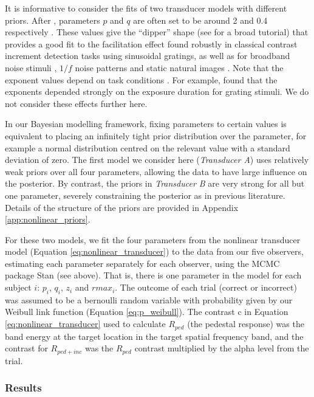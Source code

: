 \documentclass[11pt,a4paper]{article}
\begin{document}
It is informative to consider the fits of two transducer models with different priors.
After \citet{Legge1980}, parameters $p$ and $q$ are often set to be around 2 and 0.4 respectively \citep[e.g.][]{Haun2013a, Alam2014}.
These values give the ``dipper'' shape (see \citet{Solomon2009} for a broad tutorial) that provides a good fit to the facilitation effect found robustly in classical contrast increment detection tasks using sinusoidal gratings, as well as for broadband noise stimuli \citep{Henning2007}, $1/f$ noise patterns \citep{Haun2010} and static natural images \citep{Bex2007}.
Note that the exponent values depend on task conditions \citep{Wichmann1999, Meese2002, Yu2003, Kwon2008, Haun2010}. 
For example, \citet{Wichmann1999} found that the exponents depended strongly on the exposure duration for grating stimuli.
We do not consider these effects further here.

In our Bayesian modelling framework, fixing parameters to certain values is equivalent to placing an infinitely tight prior distribution over the parameter, for example a normal distribution centred on the relevant value with a standard deviation of zero.
The first model we consider here (\textit{Transducer A}) uses relatively weak priors over all four parameters, allowing the data to have large influence on the posterior.
By contrast, the priors in \textit{Transducer B} are very strong for all but one parameter, severely constraining the posterior as in previous literature.
Details of the structure of the priors are provided in Appendix \ref{app:nonlinear_priors}.

For these two models, we fit the four parameters from the nonlinear transducer model (Equation \ref{eq:nonlinear_transducer}) to the data from our five observers, estimating each parameter separately for each observer, using the MCMC package Stan (see above).
That is, there is one parameter in the model for each subject $i$: $p_i$, $q_i$, $z_i$ and $rmax_i$.
The outcome of each trial (correct or incorrect) was assumed to be a bernoulli random variable with probability given by our Weibull link function (Equation \ref{eq:p_weibull}).
The contrast $\mathrm{c}$ in Equation \ref{eq:nonlinear_transducer} used to calculate $R_{ped}$ (the pedestal response) was the band energy at the target location in the target spatial frequency band, and the contrast for $R_{ped + inc}$ was the $R_{ped}$ contrast multiplied by the alpha level from the trial.

\subsubsection{Results}
\end{document}
